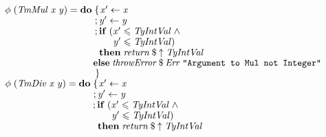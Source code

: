 \documentclass[10pt]{article}
\newcommand{\Conid}[1]{\mathit{#1}}
\newcommand{\Varid}[1]{\mathit{#1}}
\renewcommand{\leq}{\leqslant}
\begin{document}
\begin{tabbing}
${}$\\
${\hskip1.00em\relax\hskip2.00em\relax\Varid{\phi}\;(\Conid{TmMul}\;\Varid{x}\;\Varid{y})\mathrel{=}\mathbf{do}\;\{\mskip1.5mu \Varid{x'}\leftarrow \Varid{x}}$\\
${\hskip1.00em\relax\hskip2.00em\relax\phantom{\Varid{\phi}\;(\Conid{TmMul}\;\Varid{x}\;\Varid{y})\mathrel{=}\mathbf{do}\;\mbox{}};\Varid{y'}\leftarrow \Varid{y}}$\\
${\hskip1.00em\relax\hskip2.00em\relax\phantom{\Varid{\phi}\;(\Conid{TmMul}\;\Varid{x}\;\Varid{y})\mathrel{=}\mathbf{do}\;\mbox{}};\mathbf{if}\;(\Varid{x'}\leq \Conid{TyIntVal}\mathrel{\wedge}}$\\
${\hskip1.00em\relax\hskip2.00em\relax\phantom{\Varid{\phi}\;(\Conid{TmMul}\;\Varid{x}\;\Varid{y})\mathrel{=}\mathbf{do}\;\mbox{}}\phantom{;\mathbf{if}\;(\mbox{}}\Varid{y'}\leq \Conid{TyIntVal})}$\\
${\hskip1.00em\relax\hskip2.00em\relax\phantom{\Varid{\phi}\;(\Conid{TmMul}\;\Varid{x}\;\Varid{y})\mathrel{=}\mathbf{do}\;\mbox{}}\phantom{;\mbox{}}\mathbf{then}\;\Varid{return}\mathbin{\$}\Varid{\uparrow}\;\Conid{TyIntVal}}$\\
${\hskip1.00em\relax\hskip2.00em\relax\phantom{\Varid{\phi}\;(\Conid{TmMul}\;\Varid{x}\;\Varid{y})\mathrel{=}\mathbf{do}\;\mbox{}}\phantom{;\mbox{}}\mathbf{else}\;\Varid{throwError}\mathbin{\$}\Conid{Err}\;\text{\tt \char34 Argument~to~Mul~not~Integer\char34}}$\\
${\hskip1.00em\relax\hskip2.00em\relax\phantom{\Varid{\phi}\;(\Conid{TmMul}\;\Varid{x}\;\Varid{y})\mathrel{=}\mathbf{do}\;\mbox{}}\mskip1.5mu\}}$\\
${\hskip1.00em\relax\hskip2.00em\relax\Varid{\phi}\;(\Conid{TmDiv}\;\Varid{x}\;\Varid{y})\mathrel{=}\mathbf{do}\;\{\mskip1.5mu \Varid{x'}\leftarrow \Varid{x}}$\\
${\hskip1.00em\relax\hskip2.00em\relax\phantom{\Varid{\phi}\;(\Conid{TmDiv}\;\Varid{x}\;\Varid{y})\mathrel{=}\mathbf{do}\;\mbox{}};\Varid{y'}\leftarrow \Varid{y}}$\\
${\hskip1.00em\relax\hskip2.00em\relax\phantom{\Varid{\phi}\;(\Conid{TmDiv}\;\Varid{x}\;\Varid{y})\mathrel{=}\mathbf{do}\;\mbox{}};\mathbf{if}\;(\Varid{x'}\leq \Conid{TyIntVal}\mathrel{\wedge}}$\\
${\hskip1.00em\relax\hskip2.00em\relax\phantom{\Varid{\phi}\;(\Conid{TmDiv}\;\Varid{x}\;\Varid{y})\mathrel{=}\mathbf{do}\;\mbox{}}\phantom{;\mathbf{if}\;(\mbox{}}\Varid{y'}\leq \Conid{TyIntVal})}$\\
${\hskip1.00em\relax\hskip2.00em\relax\phantom{\Varid{\phi}\;(\Conid{TmDiv}\;\Varid{x}\;\Varid{y})\mathrel{=}\mathbf{do}\;\mbox{}}\phantom{;\mbox{}}\mathbf{then}\;\Varid{return}\mathbin{\$}\Varid{\uparrow}\;\Conid{TyIntVal}}$\\

\end{tabbing}
\end{document}
